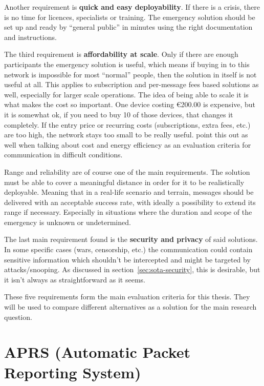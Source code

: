 Another requirement is \textbf{quick and easy deployability}. If there is a crisis, there is no time for licences, specialists or training.
The emergency solution should be set up and ready by ``general public'' in minutes using the right documentation and instructions.

The third requirement is \textbf{affordability at scale}. Only if there are enough participants the emergency solution is useful, which means if buying in to this network is impossible for most ``normal'' people, then the solution in itself is not useful at all.
This applies to subscription and per-message fees based solutions as well, especially for larger scale operations. The idea of being able to scale it is what makes the cost so important. One device costing \euro{}200.00 is expensive, but it is somewhat ok, if you need to buy 10 of those devices, that changes it completely.
If the entry price or recurring costs (subscriptions, extra fees, etc.) are too high, the network stays too small to be really useful. \textcite{ElKhaledMcheick2019} point this out as well when talking about cost and energy efficiency as an evaluation criteria for communication in difficult conditions.

Range and reliability are of course one of the main requirements. The solution must be able to cover a meaningful distance in order for it to be realistically deployable. 
Meaning that in a real-life scenario and terrain, messages should be delivered with an acceptable success rate, with ideally a possibility to extend its range if necessary.
Especially in situations where the duration and scope of the emergency is unknown or undetermined.

The last main requirement found is the \textbf{security and privacy} of said solutions. In some specific cases (wars, censorship, etc.) the communication could contain sensitive information which shouldn't be intercepted and might be targeted by attacks/snooping.
As discussed in section~\ref{sec:sota-security}, this is desirable, but it isn't always as straightforward as it seems.

These five requirements form the main evaluation criteria for this thesis. They will be used to compare different alternatives as a solution for the main research question.

\section{APRS (Automatic Packet Reporting System)}%
\label{sec:sota-aprs}

